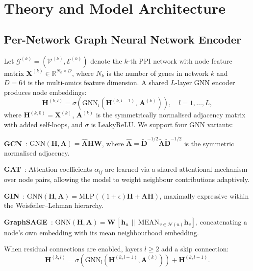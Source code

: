 
\section{Theory and Model Architecture}
\label{sec:theory}

\subsection{Per-Network Graph Neural Network Encoder}

Let $\mathcal{G}^{(k)} = (\mathcal{V}^{(k)}, \mathcal{E}^{(k)})$ denote the $k$-th PPI
network with node feature matrix $\mathbf{X}^{(k)} \in \mathbb{R}^{N_k \times D}$, where
$N_k$ is the number of genes in network $k$ and $D = 64$ is the multi-omics feature
dimension. A shared $L$-layer GNN encoder produces node embeddings:
\begin{equation}
  \mathbf{H}^{(k,l)} = \sigma\!\left(
    \text{GNN}_l\!\left(\mathbf{H}^{(k,l-1)},\, \mathbf{A}^{(k)}\right)
  \right), \quad l = 1, \ldots, L,
  \label{eq:gnn_layer}
\end{equation}
where $\mathbf{H}^{(k,0)} = \mathbf{X}^{(k)}$, $\mathbf{A}^{(k)}$ is the symmetrically
normalised adjacency matrix with added self-loops, and $\sigma$ is LeakyReLU. We support
four GNN variants:

\textbf{GCN}~\cite{gcn2017}: $\text{GNN}(\mathbf{H},\mathbf{A}) = \hat{\mathbf{A}}\mathbf{H}\mathbf{W}$,
where $\hat{\mathbf{A}} = \tilde{\mathbf{D}}^{-1/2}\tilde{\mathbf{A}}\tilde{\mathbf{D}}^{-1/2}$
is the symmetric normalised adjacency.

\textbf{GAT}~\cite{gat2018}: Attention coefficients $\alpha_{ij}$ are learned via a shared
attentional mechanism over node pairs, allowing the model to weight neighbour contributions
adaptively.

\textbf{GIN}~\cite{gin2019}: $\text{GNN}(\mathbf{H},\mathbf{A}) =
\text{MLP}\!\left((1+\epsilon)\mathbf{H} + \mathbf{A}\mathbf{H}\right)$, maximally
expressive within the Weisfeiler--Lehman hierarchy.

\textbf{GraphSAGE}~\cite{sage2017}: $\text{GNN}(\mathbf{H},\mathbf{A}) =
\mathbf{W}\,[\mathbf{h}_u \,\|\, \text{MEAN}_{v \in \mathcal{N}(u)}\mathbf{h}_v]$,
concatenating a node's own embedding with its mean neighbourhood embedding.

When residual connections are enabled, layers $l \ge 2$ add a skip connection:
\begin{equation}
  \mathbf{H}^{(k,l)} = \sigma\!\left(\text{GNN}_l\!\left(\mathbf{H}^{(k,l-1)},
  \mathbf{A}^{(k)}\right)\right) + \mathbf{H}^{(k,l-1)}.
  \label{eq:residual}
\end{equation}

